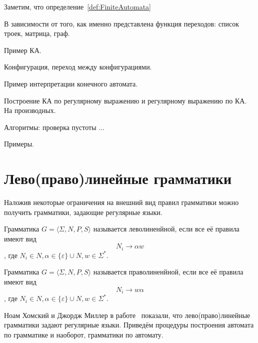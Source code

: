 Заметим, что определение~\ref{def:FiniteAutomata} 

В зависимости от того, как именно представлена функция переходов: список троек, матрица, граф.

\begin{example}
    Пример КА.    
    \begin{tikzpicture}
        
    \end{tikzpicture}
\end{example}


\begin{definition}
    Конфигурация, переход между конфигурациями.
\end{definition}

\begin{example}
Пример интерпретации конечного автомата.
\end{example}

Построение КА по регулярному выражению и регулярному выражению по КА. На производных.

Алгоритмы: проверка пустоты ... 

Примеры.


\section{Лево(право)линейные грамматики}

Наложив некоторые ограничения на внешний вид правил грамматики можно получить грамматики, задающие регулярные языки.

\begin{definition}
    Грамматика $G=\langle \Sigma, N, P, S \rangle$ называется леволиненйной, если все её правила имеют вид $$N_i \to \alpha w $$, где $N_i \in N, \alpha \in \{\varepsilon\} \cup N, w \in \Sigma ^*$.
\end{definition}

\begin{definition}
    Грамматика $G=\langle \Sigma, N, P, S \rangle$ называется праволиненйной, если все её правила имеют вид $$N_i \to  w \alpha$$, где $N_i \in N, \alpha \in \{\varepsilon\} \cup N, w \in \Sigma ^*$.
\end{definition}



Ноам Хомский и Джордж Миллер в работе~\cite{chomsky1958finite} показали, что лево(право)линейные грамматики задают регулярные языки. 
Приведём процедуры построения автомата по грамматике и наоборот, грамматики по автомату.

